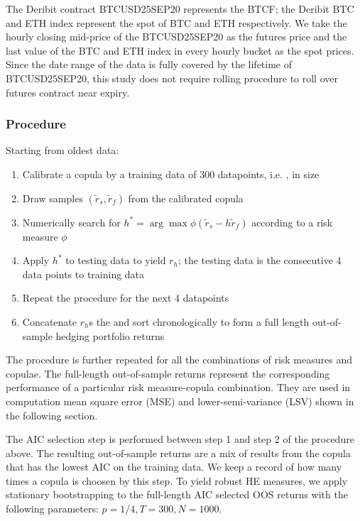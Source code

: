 \documentclass[11pt,a4paper,english]{article}
\begin{document}
The Deribit contract BTCUSD25SEP20 represents the BTCF;
the Deribit BTC and ETH index represent the spot of BTC and ETH respectively.
We take the hourly closing mid-price of the BTCUSD25SEP20 as the futures price and the last value of the BTC and ETH index in every hourly bucket as the spot prices.
Since the date range of the data is fully covered by the lifetime of BTCUSD25SEP20, this study does not require rolling procedure to roll over futures contract near expiry.

\subsubsection{Procedure}
Starting from oldest data:
\begin{enumerate}
    \item Calibrate a copula by a training data of 300 datapoints, i.e. , in size
    \item Draw samples $(\tilde r_s, \tilde r_f)$ from the calibrated copula
    \item Numerically search for $h^* = \arg \max \phi(\tilde r_s - h\tilde r_f)$ according to a risk measure $\phi$
    \item Apply $h^*$ to testing data to yield $r_h$; the testing data is the consecutive 4 data points to training data
    \item Repeat the procedure for the next 4 datapoints
    \item Concatenate $r_h$s the and sort chronologically to form a full length out-of-sample hedging portfolio returns
\end{enumerate}

The procedure is further repeated for all the combinations of risk measures and copulae.
The full-length out-of-sample returns represent the corresponding performance of a particular risk measure-copula combination.
They are used in computation mean square error (MSE) and lower-semi-variance (LSV) shown in the following section.

The AIC selection step is performed between step 1 and step 2 of the procedure above.
The resulting out-of-sample returns are a mix of results from the copula that has the lowest AIC on the training data.
We keep a record of how many times a copula is choosen by this step.
To yield robust HE measures, we apply stationary bootstrapping to the full-length AIC selected OOS returns with the following parameters: $p=1/4, T=300, N=1000$.
\end{document}
